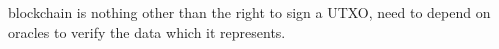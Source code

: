 blockchain is nothing other than the right to sign a UTXO, need to depend on oracles to verify the data which it represents.
